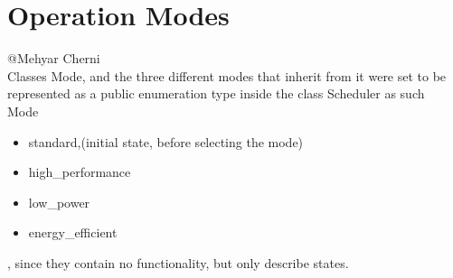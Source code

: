 \documentclass[parskip=full]{scrartcl}
\newcommand\tab[1][1cm]{\hspace*{#1}}
\begin{document}
\pagebreak


\section{Operation Modes} \label{Operation Modes}
	@Mehyar Cherni\\
	\tab Classes Mode, and the three different modes that inherit from it were set to be represented as a public enumeration type inside the class Scheduler as such \\ Mode
	\begin {itemize}
		\item standard,(initial state, before selecting the mode)
		\item high\_performance 
		\item low\_power
		\item energy\_efficient
	\end{itemize} 
	 , since they contain no functionality, but only describe states.


\pagebreak
\end{document}
